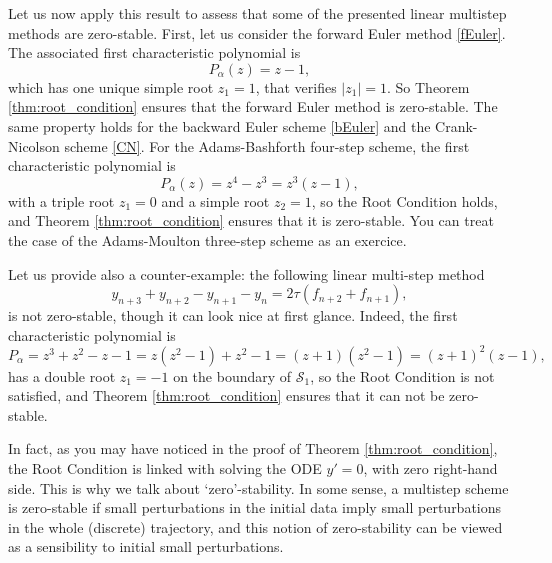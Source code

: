 \documentclass{article}
\begin{document}
Let us now apply this result to assess that some of the presented linear multistep methods are zero-stable. First, let us consider the forward Euler method \eqref{fEuler}. The associated first characteristic polynomial is
\[
P_\alpha (z) = z - 1,
\]
which has one unique simple root $z_1 = 1$, that verifies $|z_1| = 1$. So Theorem \ref{thm:root_condition} ensures that the forward Euler method is zero-stable. The same property holds for the backward Euler scheme \eqref{bEuler} and the Crank-Nicolson scheme \eqref{CN}.
For the Adams-Bashforth four-step scheme, the first characteristic polynomial is
\[
P_\alpha (z) = z^4 - z^3 = z^3 (z - 1),
\]
with a triple root $z_1=0$ and a simple root $z_2=1$, so the Root Condition holds, and Theorem \ref{thm:root_condition} ensures that it is zero-stable. You can treat the case of the Adams-Moulton three-step scheme as an exercice.

Let us provide also a counter-example: the following linear multi-step me\-thod
\[
y_{n+3} + y_{n+2} - y_{n+1} - y_n = 2 \tau ( f_{n+2} + f_{n+1} ),
\]
is not zero-stable, though it can look nice at first glance. Indeed, the first characteristic polynomial
is
\[
P_\alpha = z^3 + z^2 - z - 1 = z ( z^2 -1 ) + z^2 - 1 = ( z + 1 ) ( z^2 - 1 ) = ( z + 1 )^2 ( z - 1 ),
\]
has a double root $z_1=-1$ on the boundary of $\mathcal{S}_1$, so the Root Condition is not satisfied, and Theorem \ref{thm:root_condition} ensures that it can not be zero-stable.

\medskip

In fact, as you may have noticed in the proof of Theorem \ref{thm:root_condition}, the Root Condition is linked with solving the ODE $y'=0$, with zero right-hand side. This is why we talk about `zero'-stability. In some sense, a multistep scheme is zero-stable if small perturbations in the initial data imply small perturbations in the whole (discrete) trajectory, and this notion of zero-stability can be viewed as a sensibility to initial small perturbations.

\medskip
\end{document}
